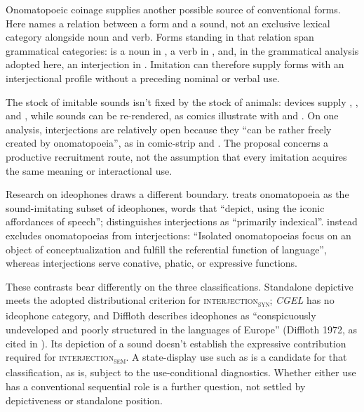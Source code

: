 \documentclass[12pt]{article}
\newcommand{\intj}[1]{\textsc{interjection\textsubscript{#1}}}
\begin{document}
Onomatopoeic coinage supplies another possible source of conventional forms. Here  names a relation between a form and a sound, not an exclusive lexical category alongside noun and verb. Forms standing in that relation span grammatical categories:  is a noun in , a verb in , and, in the grammatical analysis adopted here, an interjection in . Imitation can therefore supply forms with an interjectional profile without a preceding nominal or verbal use.

The stock of imitable sounds isn't fixed by the stock of animals: devices supply , , and , while sounds can be re-rendered, as comics illustrate with  and . On one analysis, interjections are relatively open because they \enquote{can be rather freely created by onomatopoeia}, as in comic-strip  and  \citep[74]{quirk1985}. The proposal concerns a productive recruitment route, not the assumption that every imitation acquires the same meaning or interactional use.

Research on ideophones draws a different boundary. \textcite[3, 19]{dingemanse2018} treats onomatopoeia as the sound-imitating subset of ideophones, words that \enquote{depict, using the iconic affordances of speech}; \textcite[529]{dingemanseakita2017} distinguishes interjections as \enquote{primarily indexical}. \textcite[150, 167]{meinard2015} instead excludes onomatopoeias from interjections: \enquote{Isolated onomatopoeias focus on an object of conceptualization and fulfill the referential function of language}, whereas interjections serve conative, phatic, or expressive functions.

These contrasts bear differently on the three classifications. Standalone depictive  meets the adopted distributional criterion for \intj{syn}; \textit{CGEL} has no ideophone category, and Diffloth describes ideophones as \enquote{conspicuously undeveloped and poorly structured in the languages of Europe} (Diffloth 1972, as cited in \citealp[12]{dingemanse2018}). Its depiction of a sound doesn't establish the expressive contribution required for \intj{sem}. A state-display use such as  is a candidate for that classification, as  is, subject to the use-conditional diagnostics. Whether either use has a conventional sequential role is a further question, not settled by depictiveness or standalone position.
\end{document}

